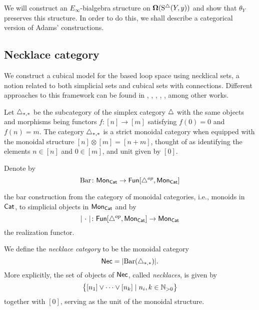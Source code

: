 We will construct an $E_{\infty}$-bialgebra structure on $\operatorname{\mathbf{\Omega}}(\operatorname{S^{\triangle}}(Y, y))$ and show that $\theta_Y$ preserves this structure.
In order to do this, we shall describe a categorical version of Adams' constructions.

\subsection{Necklace category}

We construct a cubical model for the based loop space using necklical sets, a notion related to both simplicial sets and cubical sets with connections.
Different approaches to this framework can be found in \cite{baues1998hopf}, \cite{galvez2020hopf}, \cite{dugger2011rigidification}, \cite{rivera2018cubical}, \cite{rivera2019path}, among other works.

Let $\triangle_{*,*}$ be the subcategory of the simplex category $\triangle$ with the same objects and morphisms being functors $f \colon [n] \to [m]$ satisfying $f(0) = 0$ and $f(n) = m$.
The category $\triangle_{*,*}$ is a strict monoidal category when equipped with the monoidal structure $[n] \otimes [m] = [n+m]$, thought of as identifying the elements $n \in [n]$ and $0 \in [m]$, and unit given by $[0]$.

Denote by
\begin{equation*}
\operatorname{Bar} \colon \mathsf{Mon}_{\mathsf{Cat}} \to \mathsf{Fun}[\triangle^{op}, \mathsf{Mon}_{\mathsf{Cat}}]
\end{equation*}

the bar construction from the category of monoidal categories, i.e., monoids in $\mathsf{Cat}$, to simplicial objects in $\mathsf{Mon}_{\mathsf{Cat}}$ and by
\begin{equation*}
\vert{\ \cdot \ }\vert \colon \mathsf{Fun}[\triangle^{op}, \mathsf{Mon}_{\mathsf{Cat}}] \to \mathsf{Mon}_{\mathsf{Cat}}
\end{equation*}
the realization functor.

We define the \textit{necklace category} to be the monoidal category
\begin{equation*}
\mathsf{Nec} = \vert{\operatorname{Bar}(\triangle_{*,*})}\vert.
\end{equation*}
More explicitly, the set of objects of $\mathsf{Nec}$, called \textit{necklaces}, is given by
\begin{equation*}
\big\{ [n_1] \vee \cdots \vee[n_k] \mid n_i, k \in \mathbb{N}_{>0} \big\}
\end{equation*}
together with $[0]$, serving as the unit of the monoidal structure.

